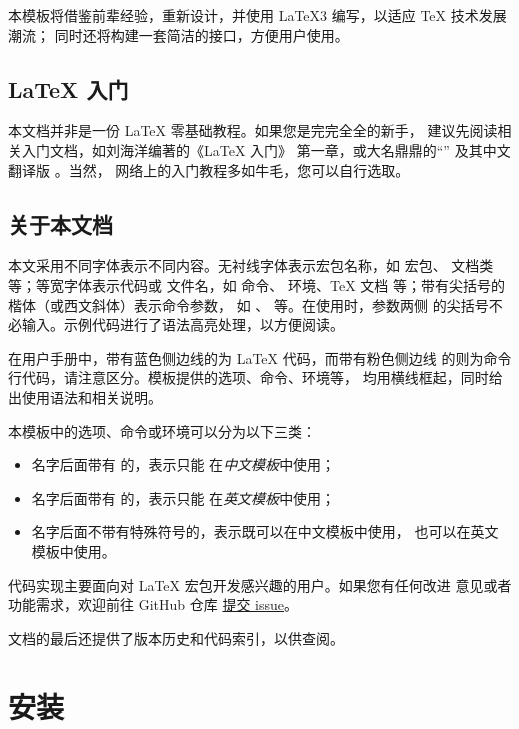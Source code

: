 \documentclass{ccnudoc}
\begin{document}
本模板将借鉴前辈经验，重新设计，并使用 \LaTeX3
\cite{source3} 编写，以适应 \TeX{} 技术发展潮流；
同时还将构建一套简洁的接口，方便用户使用。

\subsection*{\LaTeX{} 入门}

本文档并非是一份 \LaTeX{} 零基础教程。如果您是完完全全的新手，
建议先阅读相关入门文档，如刘海洋编著的《\LaTeX{} 入门》
\cite{刘海洋2013latex入门} 第一章，或大名鼎鼎的“”
\cite{lshort} 及其中文翻译版 \cite{lshort-zh-cn}。当然，
网络上的入门教程多如牛毛，您可以自行选取。

\subsection*{关于本文档}

本文采用不同字体表示不同内容。无衬线字体表示宏包名称，如
 宏包、 文档类等；等宽字体表示代码或
文件名，如  命令、 环境、\TeX{} 文档
 等；带有尖括号的楷体（或西文斜体）表示命令参数，
如 、 等。在使用时，参数两侧
的尖括号不必输入。示例代码进行了语法高亮处理，以方便阅读。

在用户手册中，带有蓝色侧边线的为 \LaTeX{} 代码，而带有粉色侧边线
的则为命令行代码，请注意区分。模板提供的选项、命令、环境等，
均用横线框起，同时给出使用语法和相关说明。

本模板中的选项、命令或环境可以分为以下三类：
\begin{itemize}
  \item 名字后面带有 \rexptarget\rexpstar{} 的，表示只能
    在\emph{中文模板}中使用；
  \item 名字后面带有 \exptarget\expstar{} 的，表示只能
    在\emph{英文模板}中使用；
  \item 名字后面不带有特殊符号的，表示既可以在中文模板中使用，
    也可以在英文模板中使用。
\end{itemize}

代码实现主要面向对 \LaTeX{} 宏包开发感兴趣的用户。如果您有任何改进
意见或者功能需求，欢迎前往 GitHub 仓库
\href{https://github.com/stone-zeng/fduthesis/issues}{提交 issue}。

文档的最后还提供了版本历史和代码索引，以供查阅。

\section{安装}
\end{document}
